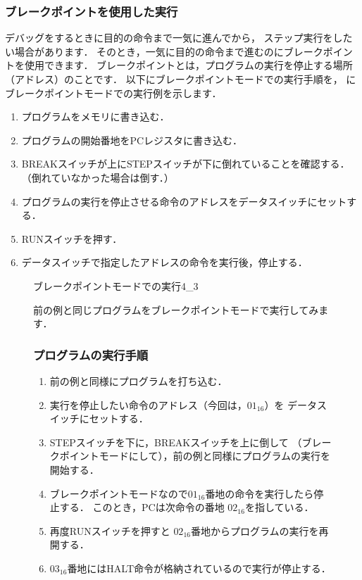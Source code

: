 \subsubsection{ブレークポイントを使用した実行}
デバッグをするときに目的の命令まで一気に進んでから，
ステップ実行をしたい場合があります．
そのとき，一気に目的の命令まで進むのにブレークポイントを使用できます．
ブレークポイントとは，プログラムの実行を停止する場所（アドレス）のことです．
以下にブレークポイントモードでの実行手順を，
にブレークポイントモードでの実行例を示します．

\begin{enumerate}
\item プログラムをメモリに書き込む．
\item プログラムの開始番地をPCレジスタに書き込む．
\item BREAKスイッチが上にSTEPスイッチが下に倒れていることを確認する．\\
（倒れていなかった場合は倒す．）
\item プログラムの実行を停止させる命令のアドレスをデータスイッチにセットする．
\item RUNスイッチを押す．
\item データスイッチで指定したアドレスの命令を実行後，停止する．
\end{enumerate}

\begin{figure}[tb]
\begin{rei}{ブレークポイントモードでの実行}{4_3}

前の例と同じプログラムをブレークポイントモードで実行してみます．

\subsubsection{プログラムの実行手順}
\begin{enumerate}
\item 前の例と同様にプログラムを打ち込む．
\item 実行を停止したい命令のアドレス（今回は，$01_{16}$）を
データスイッチにセットする．
\item STEPスイッチを下に，BREAKスイッチを上に倒して
（ブレークポイントモードにして），前の例と同様にプログラムの実行を開始する．
\item ブレークポイントモードなので$01_{16}$番地の命令を実行したら停止する．
このとき，PCは次命令の番地 $02_{16}$を指している．
\item 再度RUNスイッチを押すと $02_{16}$番地からプログラムの実行を再開する．
\item $03_{16}$番地にはHALT命令が格納されているので実行が停止する．
\end{enumerate}
\end{rei}
\end{figure}

